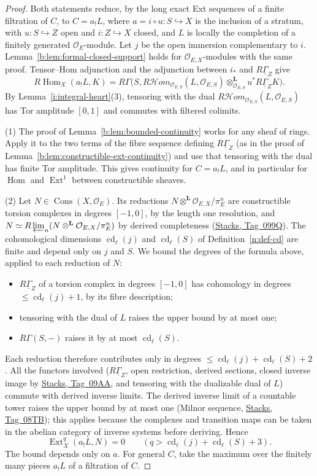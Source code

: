 \documentclass[11pt,a4paper]{article}
\numberwithin{equation}{section}
\theoremstyle{definition}
\theoremstyle{remark}
\newcommand{\RHom}{R\!\operatorname{Hom}}
\newcommand{\cHom}{R\mathcal{H}\!om}
\newcommand{\stacks}[1]{\href{https://stacks.math.columbia.edu/tag/#1}{\textnormal{Stacks, Tag~#1}}}
\newcommand{\Hom}{\operatorname{Hom}}
\newcommand{\Ext}{\operatorname{Ext}}
\newcommand{\Cons}{\operatorname{Cons}}
\begin{document}
\begin{proof}
Both statements reduce, by the long exact Ext sequences of a finite
filtration of $C$, to $C=a_!L$, where $a=i\circ u:S\hookrightarrow X$ is
the inclusion of a stratum, with $u:S\hookrightarrow Z$ open and
$i:Z\hookrightarrow X$ closed, and $L$ is locally the completion of a
finitely generated $\mathcal O_E$-module. Let $j$ be the open immersion
complementary to $i$. Lemma~\ref{b:lem:formal-closed-support} holds for
$\mathcal O_{E,X}$-modules with the same proof. Tensor--Hom
adjunction and the adjunction between $i_*$ and $R\underline\Gamma_Z$
give
\[
 \RHom_X(a_!L,K)
  =R\Gamma\bigl(S,\cHom_{\mathcal O_{E,S}}(L,\mathcal O_{E,S})
     \otimes_{\mathcal O_{E,S}}^{\mathbf L} u^*R\underline\Gamma_ZK\bigr).
\]
By Lemma~\ref{i:integral-heart}(3), tensoring with the dual
$\cHom_{\mathcal O_{E,S}}(L,\mathcal O_{E,S})$ has Tor amplitude $[0,1]$
and commutes with filtered colimits.

(1) The proof of Lemma~\ref{b:lem:bounded-continuity} works for any sheaf
of rings. Apply it to the two terms of the fibre sequence defining
$R\underline\Gamma_Z$ (as in the proof of
Lemma~\ref{b:lem:constructible-ext-continuity}) and use that tensoring
with the dual has finite Tor amplitude. This gives continuity for
$C=a_!L$, and in particular for $\Hom$ and $\Ext^1$ between
constructible sheaves.

(2) Let $N\in\Cons(X,\mathcal O_E)$. Its reductions
$N\otimes^{\mathbf L}\mathcal O_{E,X}/\pi_E^n$ are constructible torsion
complexes in degrees $[-1,0]$, by the length one resolution, and
$N\simeq R\varprojlim_n(N\otimes^{\mathbf L}\mathcal O_{E,X}/\pi_E^n)$ by
derived completeness (\stacks{099Q}). The cohomological dimensions
$\operatorname{cd}_\ell(j)$ and $\operatorname{cd}_\ell(S)$ of
Definition~\ref{n:def-cd} are finite and depend only on $j$ and $S$. We
bound the degrees of the formula above, applied to each reduction of $N$:
\begin{itemize}
\item $R\underline\Gamma_Z$ of a torsion complex in degrees $[-1,0]$ has
  cohomology in degrees $\le\operatorname{cd}_\ell(j)+1$, by its fibre
  description;
\item tensoring with the dual of $L$ raises the upper bound by at most
  one;
\item $R\Gamma(S,-)$ raises it by at most $\operatorname{cd}_\ell(S)$.
\end{itemize}
Each reduction therefore contributes only in degrees
$\le\operatorname{cd}_\ell(j)+\operatorname{cd}_\ell(S)+2$. All the functors
involved ($R\underline\Gamma_Z$, open restriction, derived sections,
closed inverse image by \stacks{09AA}, and tensoring with the dualizable
dual of $L$) commute with derived inverse limits. The derived inverse
limit of a countable tower raises the upper bound by at most one (Milnor
sequence, \stacks{08TB}); this applies because the complexes and
transition maps can be taken in the abelian category of inverse systems
before deriving. Hence
\[
 \Ext^q_X(a_!L,N)=0\qquad(q>\operatorname{cd}_\ell(j)+\operatorname{cd}_\ell(S)+3).
\]
The bound depends only on $a$. For general $C$, take the maximum over
the finitely many pieces $a_!L$ of a filtration of $C$.
\end{proof}
\end{document}
